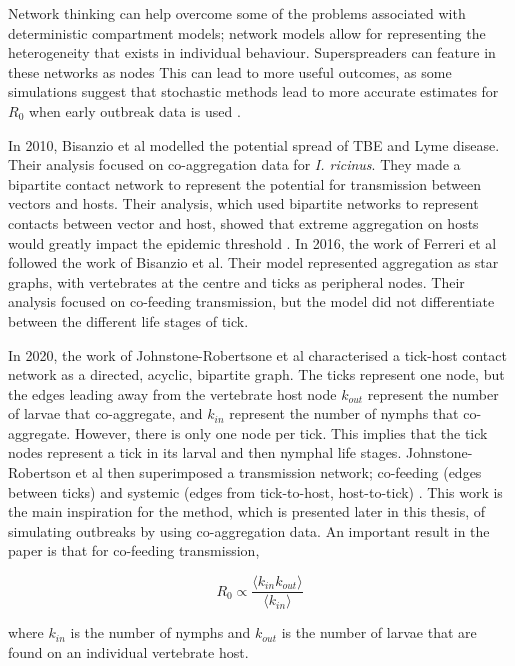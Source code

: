 \documentclass{article}
\begin{document}
Network thinking can help overcome some of the problems associated with deterministic compartment models; network models allow for representing the heterogeneity that exists in individual behaviour. Superspreaders can feature in these networks as nodes 
This can lead to more useful outcomes, as some simulations suggest that stochastic methods lead to more accurate estimates for $ R_0 $ when early outbreak data is used \cite{Brauer2008b}.

In 2010, Bisanzio et al modelled the potential spread of TBE and Lyme disease. Their analysis focused on co-aggregation data for \textit{I. ricinus}. They made a bipartite contact network to represent the potential for transmission between vectors and hosts. Their analysis, which used bipartite networks to represent contacts between vector and host, showed that extreme aggregation on hosts would greatly impact the epidemic threshold \cite{Bisanzio2010}. In 2016, the work of Ferreri et al followed the work of Bisanzio et al. Their model represented aggregation as star graphs, with vertebrates at the centre and ticks as peripheral nodes. Their analysis focused on co-feeding transmission, but the model did not differentiate between the different life stages of tick.

In 2020, the work of Johnstone-Robertsone et al characterised a tick-host contact network as a directed, acyclic, bipartite graph. The ticks represent one node, but the edges leading away from the vertebrate host node $ k_{out} $ represent the number of larvae that co-aggregate, and $ k_{in} $ represent the number of nymphs that co-aggregate. However, there is only one node per tick. This implies that the tick nodes represent a tick in its larval and then nymphal life stages. Johnstone-Robertson et al then superimposed a transmission network; co-feeding (edges between ticks) and systemic (edges from tick-to-host, host-to-tick) \cite{JohnstoneRobertson2020}. This work is the main inspiration for the method, which is presented later in this thesis, of simulating outbreaks by using co-aggregation data. An important result in the paper is that for co-feeding transmission, 

\begin{equation} \label{JohnstoneRobertsonR0Estimate}
	R_0 \propto \frac{\langle k_{in}k_{out} \rangle}{\langle k_{in} \rangle } 
\end{equation}

where $ k_{in} $ is the number of nymphs and $ k_{out} $ is the number of larvae that are found on an individual vertebrate host.
\end{document}
